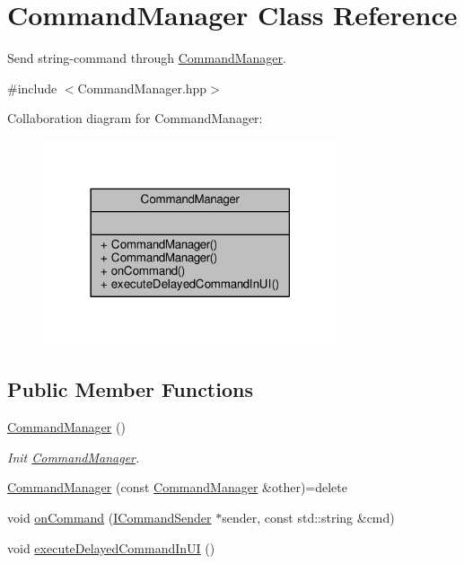 \hypertarget{class_command_manager}{\section{Command\-Manager Class Reference}
\label{class_command_manager}
}


Send string-\/command through \hyperlink{class_command_manager}{Command\-Manager}.  




{\ttfamily \#include $<$Command\-Manager.\-hpp$>$}



Collaboration diagram for Command\-Manager\-:
\nopagebreak
\begin{figure}[H]
\begin{center}
\leavevmode
\includegraphics[width=246pt]{class_command_manager__coll__graph}
\end{center}
\end{figure}
\subsection*{Public Member Functions}
\begin{DoxyCompactItemize}
\item 
\hyperlink{class_command_manager_a8a13226bf933396a3f35dfb5bee3e813}{Command\-Manager} ()
\begin{DoxyCompactList}\small\item\em Init \hyperlink{class_command_manager}{Command\-Manager}. \end{DoxyCompactList}\item 
\hyperlink{class_command_manager_aeaffe7fa7dd8f1dd45b642120013a076}{Command\-Manager} (const \hyperlink{class_command_manager}{Command\-Manager} \&other)=delete
\item 
void \hyperlink{class_command_manager_abef8721bbe32e1ecb22f2f3d3b8c0601}{on\-Command} (\hyperlink{class_i_command_sender}{I\-Command\-Sender} $\ast$sender, const std\-::string \&cmd)
\item 
void \hyperlink{class_command_manager_a6782f9787d0e35ee3cc0eff69f764fa2}{execute\-Delayed\-Command\-In\-U\-I} ()
\end{DoxyCompactItemize}


